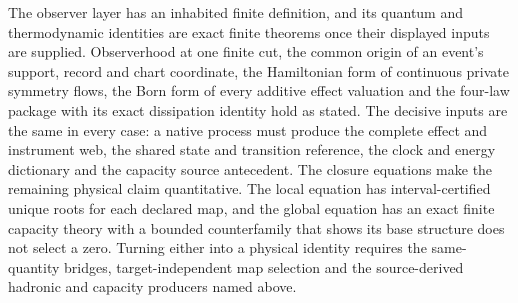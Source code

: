 The observer layer has an inhabited finite definition, and its quantum and
thermodynamic identities are exact finite theorems once their displayed
inputs are supplied. Observerhood at one finite cut, the common origin of an
event's support, record and chart coordinate, the Hamiltonian form of
continuous private symmetry flows, the Born form of every additive effect
valuation and the four-law package with its exact dissipation identity hold as
stated. The decisive inputs are the same in every case: a native process must
produce the complete effect and instrument web, the shared state and transition
reference, the clock and energy dictionary and the capacity source
antecedent. The closure equations make the remaining physical claim
quantitative. The local equation has interval-certified unique roots for each
declared map, and the global equation has an exact finite capacity theory with
a bounded counterfamily that shows its base structure does not select a zero.
Turning either into a physical identity requires the same-quantity bridges,
target-independent map selection and the source-derived hadronic and capacity
producers named above.

